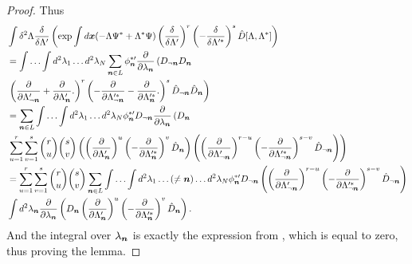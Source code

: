 \begin{proof}
Thus
\begin{equation*}
\begin{split}
	& \int \delta^2\Lambda
		\frac{\delta}{\delta \Lambda^\prime} \left(
			\exp \int d\boldsymbol{x} (-\Lambda \Psi^* + \Lambda^* \Psi)
			\left( \frac{\delta}{\delta \Lambda^\prime} \right)^r
			\left( -\frac{\delta}{\delta \Lambda^{\prime*}} \right)^s
			\hat{D}[\Lambda, \Lambda^*]
		\right) \\
	& = \int \ldots \int d^2\lambda_1 \ldots d^2\lambda_N
		\sum_{\boldsymbol{n} \in L}
		\phi_{\boldsymbol{n}}^{*\prime}
		\frac{\partial}{\partial \lambda_{\boldsymbol{n}}} \left(
			D_{\lnot \boldsymbol{n}} D_{\boldsymbol{n}}
		\right.	\\
		& \left.
			\left(
				\frac{\partial}{\partial \Lambda_{\lnot \boldsymbol{n}}^\prime}
				+ \frac{\partial}{\partial \Lambda_{\boldsymbol{n}}^\prime}.
			\right)^r
			\left(
				-\frac{\partial}{\partial \Lambda_{\lnot \boldsymbol{n}}^{\prime*}}
				-\frac{\partial}{\partial \Lambda_{\boldsymbol{n}}^{\prime*}}.
			\right)^s
			\hat{D}_{\lnot \boldsymbol{n}} \hat{D}_{\boldsymbol{n}}
		\right) \\
	& = \sum_{\boldsymbol{n} \in L} \int \ldots \int d^2\lambda_1 \ldots d^2\lambda_N
		\phi_{\boldsymbol{n}}^{*\prime} D_{\lnot \boldsymbol{n}}
		\frac{\partial}{\partial \lambda_{\boldsymbol{n}}} \left(
			D_{\boldsymbol{n}}
		\right.	\\
	& \left.
		\sum_{u=1}^r \sum_{v=1}^s \binom{r}{u} \binom{s}{v}
			\left(
				\left( \frac{\partial}{\partial \Lambda_{\boldsymbol{n}}^\prime} \right)^u
				\left( -\frac{\partial}{\partial \Lambda_{\boldsymbol{n}}^{\prime*}} \right)^v
				\hat{D}_{\boldsymbol{n}}
			\right)
			\left(
				\left( \frac{\partial}{\partial \Lambda_{\lnot \boldsymbol{n}}^\prime} \right)^{r-u}
				\left( -\frac{\partial}{\partial \Lambda_{\lnot \boldsymbol{n}}^{\prime*}} \right)^{s-v}
				\hat{D}_{\lnot \boldsymbol{n}}
			\right)
		\right) \\
	& = \sum_{u=1}^r \sum_{v=1}^s \binom{r}{u} \binom{s}{v}
		\sum_{\boldsymbol{n} \in L}
		\int \ldots \int d^2\lambda_1 \ldots (\ne \boldsymbol{n}) \ldots d^2\lambda_N
		\phi_{\boldsymbol{n}}^{*\prime} D_{\lnot \boldsymbol{n}}
		\left(
			\left( \frac{\partial}{\partial \Lambda_{\lnot \boldsymbol{n}}^\prime} \right)^{r-u}
			\left( -\frac{\partial}{\partial \Lambda_{\lnot \boldsymbol{n}}^{\prime*}} \right)^{s-v}
			\hat{D}_{\lnot \boldsymbol{n}}
		\right) \\
	&	\int d^2\lambda_{\boldsymbol{n}} \frac{\partial}{\partial \lambda_{\boldsymbol{n}}} \left(
			D_{\boldsymbol{n}}
			\left( \frac{\partial}{\partial \Lambda_{\boldsymbol{n}}^\prime} \right)^u
			\left( -\frac{\partial}{\partial \Lambda_{\boldsymbol{n}}^{\prime*}} \right)^v
			\hat{D}_{\boldsymbol{n}}
		\right).
\end{split}
\end{equation*}
And the integral over $\lambda_{\boldsymbol{n}}$ is exactly the expression from ,
which is equal to zero,
thus proving the lemma.
\end{proof}

